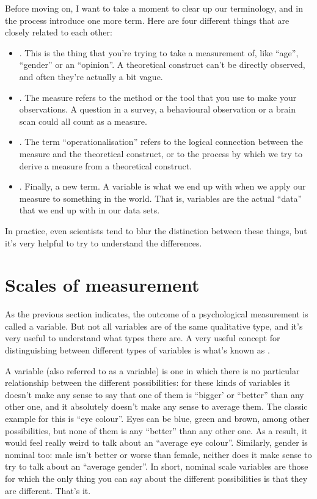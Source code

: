 Before moving on, I want to take a moment to clear up our terminology, and in the process introduce one more term. Here are four different things that are closely related to each other:

\begin{itemize}
\item {}. This is the thing that you're trying to take a measurement of, like ``age'', ``gender'' or an ``opinion''. A theoretical construct can't be directly observed, and often they're actually a bit vague. 
\item {}. The measure refers to the method or the tool that you use to make your observations. A question in a survey, a behavioural observation or a brain scan could all count as a measure. 
\item {}. The term ``operationalisation'' refers to the logical connection between the measure and the theoretical construct, or to the process by which we try to derive a measure from a theoretical construct.
\item {}. Finally, a new term. A variable is what we end up with when we apply our measure to something in the world. That is, variables are the actual ``data'' that we end up with in our data sets.
\end{itemize}

\noindent
In practice, even scientists tend to blur the distinction between these things, but it's very helpful to try to understand the differences.

\section{Scales of measurement\label{sec:scales}}

As the previous section indicates, the outcome of a psychological measurement is called a  variable. But not all variables are of the same qualitative type, and it's very useful to understand what types there are. A very useful concept for distinguishing between different types of variables is what's known as . 



A  variable (also referred to as a  variable) is one in which there is no particular relationship between the different possibilities: for these kinds of variables it doesn't make any sense to say that one of them is ``bigger' or ``better'' than any other one, and it absolutely doesn't make any sense to average them. The classic example for this is ``eye colour''. Eyes can be blue, green and brown, among other possibilities, but none of them is any ``better'' than any other one. As a result, it would feel really weird to talk about an ``average eye colour''. Similarly, gender is nominal too: male isn't better or worse than female, neither does it make sense to try to talk about an ``average gender''. In short, nominal scale variables are those for which the only thing you can say about the different possibilities is that they are different. That's it.


